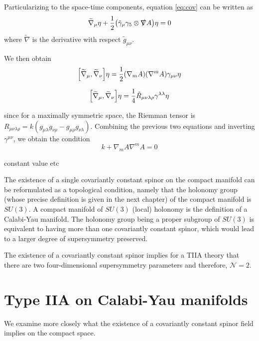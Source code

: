 Particularizing to the space-time components, equation \eqref{eq:cov} can be written as
\begin{equation}
  \widetilde{\nabla}_\mu \eta + \frac{1}{2}\qty(\tilde{\gamma}_\mu \gamma_5 \otimes \slashed \nabla A) \eta=0
\end{equation}
where $\widetilde{\nabla}$ is the derivative with respect $\tilde g_{\mu\nu}$.

We then obtain
\begin{equation}
  \qty[\widetilde \nabla_\mu,\widetilde \nabla_\nu]\eta=\frac{1}{2}\qty(\nabla_m A)\qty(\nabla^m A)\gamma_{\mu\nu}\eta
\end{equation}

\begin{equation}
  \qty[\widetilde \nabla_\mu,\widetilde \nabla_\nu]\eta=\frac{1}{4}\tilde R_{\mu\nu\lambda\rho} \gamma^{\lambda\lambda}\eta
\end{equation}

since for a maximally symmetric space, the Riemman tensor is $R_{\mu\nu\lambda\rho}=k(g_{\mu\lambda}g_{\nu\rho}-g_{\mu\rho}g_{\nu\lambda})$.
Combining the previous two equations and inverting $\gamma^{\mu\nu}$, we obtain the condition
\begin{equation}
  k + \nabla_m A \nabla^m A =0
\end{equation}

constant value etc

The existence of a single covariantly constant spinor on the compact manifold can be reformulated
as a topological condition, namely that the holonomy group (whose precise definition is given in the next chapter) of the compact manifold is $SU(3)$.
A compact manifold of $SU(3)$ (local) holonomy is the definition of a Calabi-Yau manifold.
The holonomy group being a proper subgroup of $SU(3)$ is equivalent to having more than one covariantly 
constant spinor, which would lead to a larger degree of supersymmetry preserved.

The existence of a covariantly constant spinor implies  for a TIIA theory that there are two four-dimensional supersymmetry parameters and therefore, $\mathcal N =2$.

\section{Type IIA on Calabi-Yau manifolds}
We examine more closely what the existence of a covariantly constant spinor field implies on the compact space. 

